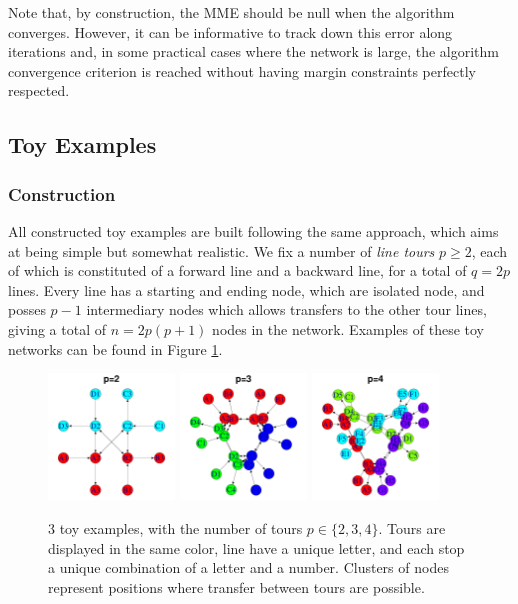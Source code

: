 \documentclass{bmcart}
\begin{document}
Note that, by construction, the MME should be null when the algorithm converges. However, it can be informative to track down this error along iterations and, in some practical cases where the network is large, the algorithm convergence criterion is reached without having margin constraints perfectly respected.

\subsection{Toy Examples}
\label{toy_examples}

\subsubsection{Construction}
\label{example_construction}

All constructed toy examples are built following the same approach, which aims at being simple but somewhat realistic. We fix a number of \emph{line tours} $p \geq 2$, each of which is constituted of a forward line and a backward line, for a total of $q = 2p$ lines. Every line has a starting and ending node, which are isolated node, and posses $p-1$ intermediary nodes which allows transfers to the other tour lines, giving a total of $n = 2p(p + 1)$ nodes in the network. Examples of these toy networks can be found in Figure \ref{toy_example_plots}.

\begin{figure}[h]
	\includegraphics[width=0.3\textwidth]{fig/toy_2_display.pdf}
	\includegraphics[width=0.3\textwidth]{fig/toy_3_display.pdf}
	\includegraphics[width=0.3\textwidth]{fig/toy_4_display.pdf}
	\caption{3 toy examples, with the number of tours $p \in \{2,3,4\}$. Tours are displayed in the same color, line have a unique letter, and each stop a unique combination of a letter and a number. Clusters of nodes represent positions where transfer between tours are possible.}
	\label{toy_example_plots}
\end{figure}
\end{document}
